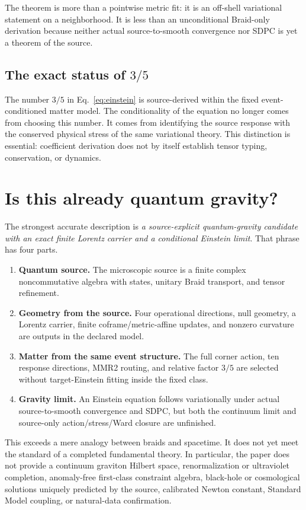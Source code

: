 \documentclass[11pt]{article}
\theoremstyle{definition}
\theoremstyle{remark}
\begin{document}
The theorem is more than a pointwise metric fit: it is an off-shell variational statement on a neighborhood. It is less than an unconditional Braid-only derivation because neither actual source-to-smooth convergence nor SDPC is yet a theorem of the source.

\subsection{The exact status of $3/5$}

The number $3/5$ in Eq.~\eqref{eq:einstein} is source-derived within the fixed event-conditioned matter model. The conditionality of the equation no longer comes from choosing this number. It comes from identifying the source response with the conserved physical stress of the same variational theory. This distinction is essential: coefficient derivation does not by itself establish tensor typing, conservation, or dynamics.

\section{Is this already quantum gravity?}

The strongest accurate description is \emph{a source-explicit quantum-gravity candidate with an exact finite Lorentz carrier and a conditional Einstein limit}. That phrase has four parts.

\begin{enumerate}
\item \textbf{Quantum source.} The microscopic source is a finite complex noncommutative algebra with states, unitary Braid transport, and tensor refinement.
\item \textbf{Geometry from the source.} Four operational directions, null geometry, a Lorentz carrier, finite coframe/metric-affine updates, and nonzero curvature are outputs in the declared model.
\item \textbf{Matter from the same event structure.} The full corner action, ten response directions, MMR2 routing, and relative factor $3/5$ are selected without target-Einstein fitting inside the fixed class.
\item \textbf{Gravity limit.} An Einstein equation follows variationally under actual source-to-smooth convergence and SDPC, but both the continuum limit and source-only action/stress/Ward closure are unfinished.
\end{enumerate}

This exceeds a mere analogy between braids and spacetime. It does not yet meet the standard of a completed fundamental theory. In particular, the paper does not provide a continuum graviton Hilbert space, renormalization or ultraviolet completion, anomaly-free first-class constraint algebra, black-hole or cosmological solutions uniquely predicted by the source, calibrated Newton constant, Standard Model coupling, or natural-data confirmation.
\end{document}
